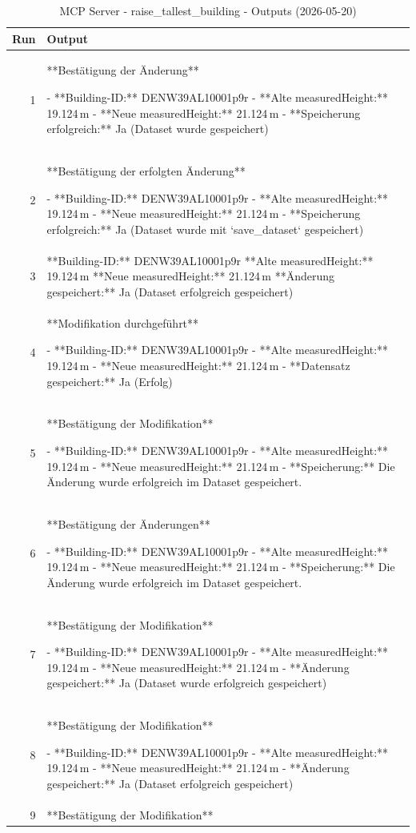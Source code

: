 \documentclass[a4paper,11pt]{article}
\begin{document}
\clearpage

\begin{table}[ht]
\centering
\scriptsize
\caption{MCP Server - raise\_tallest\_building - Outputs (2026-05-20)}
\label{tab:mcp\_raise\_tallest\_building\_outputs\_2026-05-20}
\begin{tabular}{r p{12cm}}
\hline
Run & Output \\
\hline
1 & **Bestätigung der Änderung**

- **Building-ID:** DENW39AL10001p9r  
- **Alte measuredHeight:** 19.124 m  
- **Neue measuredHeight:** 21.124 m  
- **Speicherung erfolgreich:** Ja (Dataset wurde gespeichert) \\
2 & **Bestätigung der erfolgten Änderung**

- **Building-ID:** DENW39AL10001p9r  
- **Alte measuredHeight:** 19.124 m  
- **Neue measuredHeight:** 21.124 m  
- **Speicherung erfolgreich:** Ja (Dataset wurde mit `save\_dataset` gespeichert) \\
3 & **Building-ID:** DENW39AL10001p9r  
**Alte measuredHeight:** 19.124 m  
**Neue measuredHeight:** 21.124 m  
**Änderung gespeichert:** Ja (Dataset erfolgreich gespeichert) \\
4 & **Modifikation durchgeführt**

- **Building-ID:** DENW39AL10001p9r  
- **Alte measuredHeight:** 19.124 m  
- **Neue measuredHeight:** 21.124 m  
- **Datensatz gespeichert:** Ja (Erfolg) \\
5 & **Bestätigung der Modifikation**

- **Building-ID:** DENW39AL10001p9r  
- **Alte measuredHeight:** 19.124 m  
- **Neue measuredHeight:** 21.124 m  
- **Speicherung:** Die Änderung wurde erfolgreich im Dataset gespeichert. \\
6 & **Bestätigung der Änderungen**

- **Building-ID:** DENW39AL10001p9r  
- **Alte measuredHeight:** 19.124 m  
- **Neue measuredHeight:** 21.124 m  
- **Speicherung:** Die Änderung wurde erfolgreich im Dataset gespeichert. \\
7 & **Bestätigung der Modifikation**

- **Building-ID:** DENW39AL10001p9r  
- **Alte measuredHeight:** 19.124 m  
- **Neue measuredHeight:** 21.124 m  
- **Änderung gespeichert:** Ja (Dataset wurde erfolgreich gespeichert) \\
8 & **Bestätigung der Modifikation**

- **Building-ID:** DENW39AL10001p9r  
- **Alte measuredHeight:** 19.124 m  
- **Neue measuredHeight:** 21.124 m  
- **Änderung gespeichert:** Ja (Dataset erfolgreich gespeichert) \\
9 & **Bestätigung der Modifikation**


\end{tabular}
\end{table}
\end{document}
